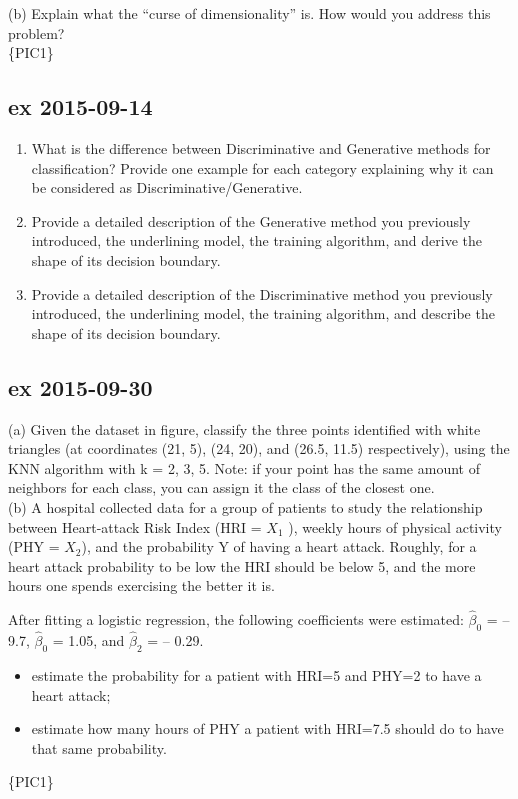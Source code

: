 \documentclass[a4paper,12pt,titlepage]{article} %
\begin{document}
(b) Explain what the “curse of dimensionality” is. How would you address this problem?\\
\{PIC1\}

\subsection{ex 2015-09-14}
\begin{enumerate}
\item[(a)] What is the difference between Discriminative and Generative methods for classification? Provide one example for each category explaining why it can be considered as Discriminative/Generative.
\item[(b)] Provide a detailed description of the Generative method you previously introduced, the underlining model, the training algorithm, and derive the shape of its decision boundary.
\item[(c)] Provide a detailed description of the Discriminative method you previously introduced, the underlining model, the training algorithm, and describe the shape of its decision boundary.
\end{enumerate}

\subsection{ex 2015-09-30}
(a) Given the dataset in figure, classify the three points identified with white triangles (at coordinates (21, 5), (24, 20), and (26.5, 11.5) respectively), using the KNN algorithm with k = 2, 3, 5. Note: if your point has the same amount of neighbors for each class, you can assign it the class of the closest one.\\

(b) A hospital collected data for a group of patients to study the relationship between Heart-attack Risk Index (HRI = $X_{1}$ ), weekly hours of physical activity (PHY = $X_{2}$), and the probability Y of having a heart attack. Roughly, for a heart attack probability to be low the HRI should be below 5, and the more hours one spends exercising the better it is.

After fitting a logistic regression, the following coefficients were estimated: $ \hat{\beta}_{0} $ = --9.7, $ \hat{\beta}_{0} $ = 1.05, and $ \hat{\beta}_{2} $ = -- 0.29.
\begin{itemize}
\item  estimate the probability for a patient with HRI=5 and PHY=2 to have a heart
attack;
\item estimate how many hours of PHY a patient with HRI=7.5 should do to have that
same probability.
\end{itemize}
\{PIC1\}
\end{document}
